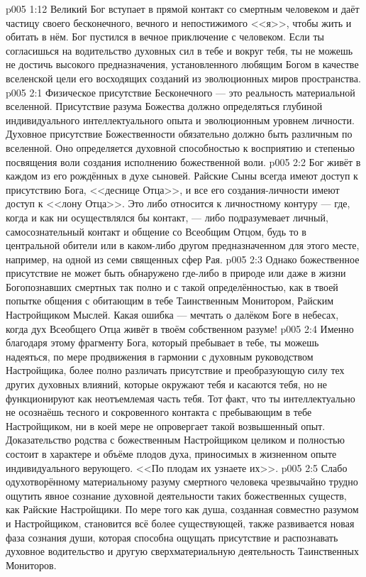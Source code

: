 \vs p005 1:12 Великий Бог вступает в прямой контакт со смертным человеком и даёт частицу своего бесконечного, вечного и непостижимого <<я>>, чтобы жить и обитать в нём. Бог пустился в вечное приключение с человеком. Если ты согласишься на водительство духовных сил в тебе и вокруг тебя, ты не можешь не достичь высокого предназначения, установленного любящим Богом в качестве вселенской цели его восходящих созданий из эволюционных миров пространства.
\vs p005 2:1 Физическое присутствие Бесконечного --- это реальность материальной вселенной. Присутствие разума Божества должно определяться глубиной индивидуального интеллектуального опыта и эволюционным уровнем личности. Духовное присутствие Божественности обязательно должно быть различным по вселенной. Оно определяется духовной способностью к восприятию и степенью посвящения воли создания исполнению божественной воли.
\vs p005 2:2 Бог живёт в каждом из его рождённых в духе сыновей. Райские Сыны всегда имеют доступ к присутствию Бога, <<деснице Отца>>, и все его создания\hyp{}личности имеют доступ к <<лону Отца>>. Это либо относится к личностному контуру --- где, когда и как ни осуществлялся бы контакт, --- либо подразумевает личный, самосознательный контакт и общение со Всеобщим Отцом, будь то в центральной обители или в каком\hyp{}либо другом предназначенном для этого месте, например, на одной из семи священных сфер Рая.
\vs p005 2:3 Однако божественное присутствие не может быть обнаружено где\hyp{}либо в природе или даже в жизни Богопознавших смертных так полно и с такой определённостью, как в твоей попытке общения с обитающим в тебе Таинственным Монитором, Райским Настройщиком Мыслей. Какая ошибка --- мечтать о далёком Боге в небесах, когда дух Всеобщего Отца живёт в твоём собственном разуме!
\vs p005 2:4 \pc Именно благодаря этому фрагменту Бога, который пребывает в тебе, ты можешь надеяться, по мере продвижения в гармонии с духовным руководством Настройщика, более полно различать присутствие и преобразующую силу тех других духовных влияний, которые окружают тебя и касаются тебя, но не функционируют как неотъемлемая часть тебя. Тот факт, что ты интеллектуально не осознаёшь тесного и сокровенного контакта с пребывающим в тебе Настройщиком, ни в коей мере не опровергает такой возвышенный опыт. Доказательство родства с божественным Настройщиком целиком и полностью состоит в характере и объёме плодов духа, приносимых в жизненном опыте индивидуального верующего. <<По плодам их узнаете их>>.
\vs p005 2:5 Слабо одухотворённому материальному разуму смертного человека чрезвычайно трудно ощутить явное сознание духовной деятельности таких божественных существ, как Райские Настройщики. По мере того как душа, созданная совместно разумом и Настройщиком, становится всё более существующей, также развивается новая фаза сознания души, которая способна ощущать присутствие и распознавать духовное водительство и другую сверхматериальную деятельность Таинственных Мониторов.
